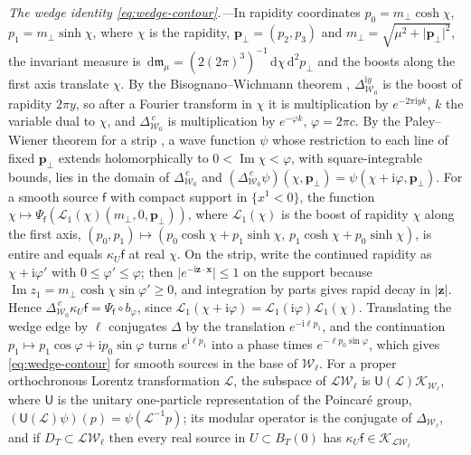\documentclass[aps,prl,reprint,longbibliography,raggedbottom]{revtex4-2}
\newcommand{\ii}{\mathrm i}
\newcommand{\dd}{\,\mathrm d}
\newcommand{\abs}[1]{\lvert #1\rvert}
\DeclareMathOperator{\Ima}{Im}
\newcommand{\sx}{\mathsf f}
\newcommand{\bx}{\mathbf x}
\newcommand{\bp}{\mathbf p}
\newcommand{\bz}{\mathbf z}
\begin{document}
\emph{The wedge identity \eqref{eq:wedge-contour}.---}In rapidity
coordinates $p_0=m_\perp\cosh\chi$, $p_1=m_\perp\sinh\chi$, where
$\chi$ is the rapidity, $\bp_\perp=(p_2,p_3)$ and
$m_\perp=\sqrt{\mu^2+\abs{\bp_\perp}^2}$, the invariant measure is
$\dd\mathfrak m_\mu=(2(2\pi)^3)^{-1}\dd\chi\dd^2p_\perp$ and the boosts
along the first axis translate $\chi$. By the Bisognano--Wichmann
theorem \cite{BW75,BGL02}, $\Delta_{\mathcal W_0}^{\ii y}$ is the boost
of rapidity $2\pi y$, so after a Fourier transform in $\chi$ it is
multiplication by $e^{-2\pi\ii yk}$, $k$ the variable dual to $\chi$,
and $\Delta_{\mathcal W_0}^{\,c}$
is multiplication by $e^{-\varphi k}$, $\varphi=2\pi c$. By the Paley--Wiener
theorem for a strip \cite{Hormander03}, a wave function $\psi$ whose restriction to each
line of fixed $\bp_\perp$ extends holomorphically to $0<\Ima\chi<\varphi$,
with square-integrable bounds, lies in the domain of
$\Delta_{\mathcal W_0}^{\,c}$ and
$(\Delta_{\mathcal W_0}^{\,c}\psi)(\chi,\bp_\perp)=\psi(\chi+\ii\varphi,\bp_\perp)$.
For a smooth source $\sx$ with compact support in $\{x^1<0\}$, the
function $\chi\mapsto\Psi_\sx(\mathcal L_1(\chi)(m_\perp,0,\bp_\perp))$,
where $\mathcal L_1(\chi)$ is the boost of rapidity $\chi$ along the
first axis,
$(p_0,p_1)\mapsto(p_0\cosh\chi+p_1\sinh\chi,\,p_1\cosh\chi+p_0\sinh\chi)$,
is entire and equals $\kappa_U\sx$ at real $\chi$. On the strip, write
the continued rapidity as $\chi+\ii\varphi'$ with
$0\le\varphi'\le\varphi$; then $\abs{e^{-\ii\bz\cdot\bx}}\le1$ on the
support because $\Ima z_1=m_\perp\cosh\chi\sin\varphi'\ge0$, and integration by parts gives
rapid decay in $\abs\bz$. Hence
$\Delta_{\mathcal W_0}^{\,c}\kappa_U\sx=\Psi_\sx\circ b_\varphi$, since
$\mathcal L_1(\chi+\ii\varphi)=\mathcal L_1(\ii\varphi)\mathcal L_1(\chi)$. Translating
the wedge edge by $\ell$ conjugates $\Delta$ by the translation
$e^{-\ii\ell p_1}$, and the continuation $p_1\mapsto p_1\cos\varphi+\ii p_0\sin\varphi$
turns $e^{\ii\ell p_1}$ into a phase times $e^{-\ell p_0\sin\varphi}$,
which gives \eqref{eq:wedge-contour} for smooth sources in the base of
$\mathcal W_\ell$. For a proper orthochronous Lorentz transformation
$\mathcal L$, the subspace of $\mathcal L\mathcal W_\ell$ is
$\mathsf U(\mathcal L)\mathcal K_{\mathcal W_\ell}$, where $\mathsf U$
is the unitary one-particle representation of the Poincar\'e group,
$(\mathsf U(\mathcal L)\psi)(p)=\psi(\mathcal L^{-1}p)$; its modular
operator is the conjugate of $\Delta_{\mathcal W_\ell}$, and if
$D_T\subset\mathcal L\mathcal W_\ell$ then every real source in
$U\subset B_T(0)$ has $\kappa_U\sx\in\mathcal K_{\mathcal L\mathcal W_\ell}$%
\end{document}
